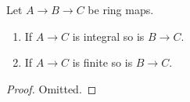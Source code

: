 \begin{lemma}
\label{lemma-integral-permanence}
Let $A \to B \to C$ be ring maps.
\begin{enumerate}
\item If $A \to C$ is integral so is $B \to C$.
\item If $A \to C$ is finite so is $B \to C$.
\end{enumerate}
\end{lemma}

\begin{proof}
Omitted.
\end{proof}